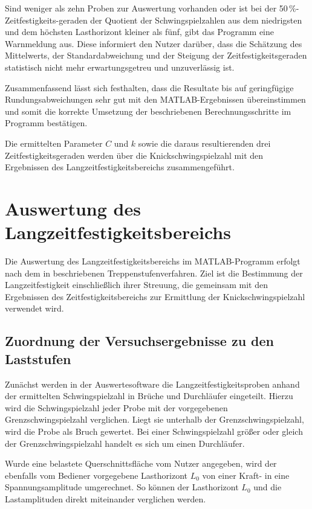 Sind weniger als zehn Proben zur Auswertung vorhanden oder ist bei der 50\,\%-Zeitfestigkeits-\newline geraden der Quotient der Schwingspielzahlen aus dem niedrigsten und dem höchsten Lasthorizont kleiner als fünf, gibt das Programm eine Warnmeldung aus. 
Diese informiert den Nutzer darüber, dass die Schätzung des Mittelwerts, der Standardabweichung und der Steigung der Zeitfestigkeitsgeraden statistisch nicht mehr erwartungsgetreu und unzuverlässig ist.

Zusammenfassend lässt sich festhalten, dass die Resultate bis auf geringfügige Rundungsabweichungen sehr gut mit den MATLAB-Ergebnissen übereinstimmen und somit die korrekte Umsetzung der beschriebenen Berechnungsschritte im Programm bestätigen.

Die ermittelten Parameter $C$ und $k$ sowie die daraus resultierenden drei Zeitfestigkeitsgeraden werden über die Knickschwingspielzahl mit den Ergebnissen des Langzeitfestigkeitsbereichs zusammengeführt.

\clearpage

	\section{Auswertung des Langzeitfestigkeitsbereichs}
	Die Auswertung des Langzeitfestigkeitsbereichs im MATLAB-Programm erfolgt nach dem in  beschriebenen Treppenstufenverfahren. Ziel ist die Bestimmung der Langzeitfestigkeit einschließlich ihrer Streuung, die gemeinsam mit den Ergebnissen des Zeitfestigkeitsbereichs zur Ermittlung der Knickschwingspielzahl verwendet wird.
	
	\subsection{Zuordnung der Versuchsergebnisse zu den Laststufen}
		Zunächst werden in der Auswertesoftware die Langzeitfestigkeitsproben anhand der ermittelten Schwingspielzahl in Brüche und Durchläufer eingeteilt.
	Hierzu wird die Schwingspielzahl jeder Probe mit der vorgegebenen Grenzschwingspielzahl verglichen. Liegt sie unterhalb der Grenzschwingspielzahl, wird die Probe als Bruch gewertet. Bei einer Schwingspielzahl größer oder gleich der Grenzschwingspielzahl handelt es sich um einen Durchläufer. 
	
	Wurde eine belastete Querschnittsfläche vom Nutzer angegeben, wird der ebenfalls vom Bediener vorgegebene Lasthorizont $L_0$ von einer Kraft- in eine Spannungsamplitude umgerechnet. So können der Lasthorizont $L_0$ und die Lastamplituden direkt miteinander verglichen werden.
	

